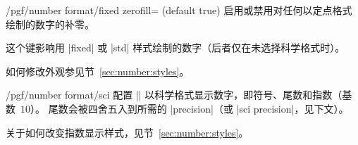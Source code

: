 \documentclass[a4paper,doc2]{ltxdoc}
\begin{document}
\begin{key}{/pgf/number format/fixed zerofill=  (default true)}
    启用或禁用对任何以定点格式绘制的数字的补零。
\begin{codeexample}[]
\hspace{1em}
\hspace{1em}
\hspace{1em}
\hspace{1em}
\end{codeexample}
    这个键影响用 |fixed| 或 |std| 样式绘制的数字（后者仅在未选择科学格式时）。
\begin{codeexample}[]
\hspace{1em}
\hspace{1em}
\hspace{1em}
\end{codeexample}

    如何修改外观参见节~\ref{sec:number:styles}。
\end{key}

\begin{key}{/pgf/number format/sci}
    配置 |\pgfmathprintnumber| 以科学格式显示数字，即符号、尾数和指数（基数~$10$）。
    尾数会被四舍五入到所需的 |precision|（或 |sci precision|，见下文）。
\begin{codeexample}[]
\hspace{1em}
\hspace{1em}
\hspace{1em}
\hspace{1em}
\end{codeexample}

    关于如何改变指数显示样式，见节~\ref{sec:number:styles}。
\end{key}
\end{document}
